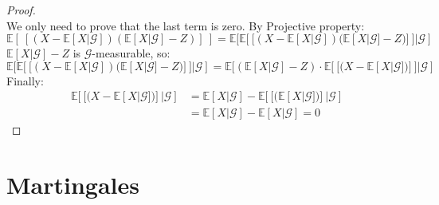 \documentclass[10pt,a4paper]{article}
\theoremstyle{definition}
\begin{document}
\begin{enumerate}
\begin{proof}
\begin{equation*}
	\end{equation*}
We only need to prove that the last term is zero.
By Projective property:
\begin{equation*}
\mathbb{E}[\ [(X-\mathbb{E}[X|\mathcal{G}])(\mathbb{E}[X|\mathcal{G}]-Z)]\ ]=
\mathbb{E}[\mathbb{E}[\ [(X-\mathbb{E}[X|\mathcal{G}])(\mathbb{E}[X|\mathcal{G}]-Z)]\ ]|\mathcal{G}]
\end{equation*}
$\mathbb{E}[X|\mathcal{G}]-Z$ is $\mathcal{G}$-measurable, so:
\begin{equation*}
	\mathbb{E}[\mathbb{E}[\ [(X-\mathbb{E}[X|\mathcal{G}])(\mathbb{E}[X|\mathcal{G}]-Z)]\ ]|\mathcal{G}]=
	\mathbb{E}[(\mathbb{E}[X|\mathcal{G}]-Z)\cdot\mathbb{E}[\ [(X-\mathbb{E}[X|\mathcal{G}])]\ ]|\mathcal{G}]
\end{equation*}
Finally:
\begin{equation*}
	\begin{split}
		\mathbb{E}[\ [(X-\mathbb{E}[X|\mathcal{G}])]\ |\mathcal{G}]&=\mathbb{E}[X|\mathcal{G}]-\mathbb{E}[\ [(\mathbb{E}[X|\mathcal{G}])]\ |\mathcal{G}]\\
		&=\mathbb{E}[X|\mathcal{G}]-\mathbb{E}[X|\mathcal{G}]=0
	\end{split}
\end{equation*}
\end{proof}
\end{enumerate}

\section{Martingales}
\end{document}
